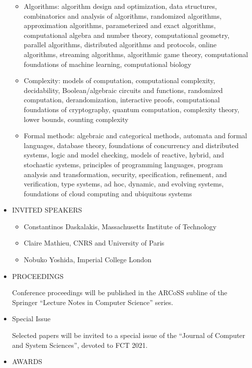 \documentclass[prodmode,acmtecs]{acmsmall} %
\begin{document}
\begin{itemize}
\begin{itemize}\item  Algorithms: algorithm design and optimization, data structures, combinatorics and analysis of algorithms, randomized algorithms, approximation algorithms, parameterized and exact algorithms, computational algebra and number theory, computational geometry, parallel algorithms, distributed algorithms and protocols, online algorithms, streaming algorithms, algorithmic game theory, computational foundations of machine learning, computational biology 
\item  Complexity: models of computation, computational complexity, decidability, Boolean/algebraic circuits and functions, randomized computation, derandomization, interactive proofs, computational foundations of cryptography, quantum computation, complexity theory, lower bounds, counting complexity
\item  Formal methods: algebraic and categorical methods, automata and formal languages, database theory, foundations of concurrency and distributed systems, logic and model checking, models of reactive, hybrid, and stochastic systems, principles of programming languages, program analysis and transformation, security, specification, refinement, and verification, type systems, ad hoc, dynamic, and evolving systems, foundations of cloud computing and ubiquitous systems
\end{itemize} 
\item  INVITED SPEAKERS 
 
\begin{itemize}\item  Constantinos Daskalakis, Massachusetts Institute of Technology
\item  Claire Mathieu, CNRS and University of Paris
\item  Nobuko Yoshida, Imperial College London
\end{itemize} 
\item  PROCEEDINGS 
 
  Conference proceedings will be published in the ARCoSS subline of the Springer ``Lecture Notes in Computer Science'' series. 
 
\item  Special Issue 
 
  Selected papers will be invited to a special issue of the ``Journal of Computer and System Sciences'', devoted to FCT 2021. 
 
\item  AWARDS 
 

\end{itemize}
\end{document}
